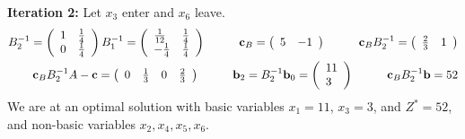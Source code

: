 \textbf{Iteration 2:}  Let $x_3$ enter and $x_6$ leave.
\begin{align*}
B_2^{-1} =\left(
\begin{array}{ll}
 1 & \frac{1}{4} \\
 0 & \frac{1}{4}
\end{array}
\right)B_1^{-1}=  \left(
\begin{array}{ll}
 \frac{1}{12} & \frac{1}{4} \\
 -\frac{1}{4} & \frac{1}{4}
\end{array}
\right)
\cm
\vec{c}_B = \left(
\begin{array}{ll}
  5 & -1
\end{array}
\right)
\cm
\vec{c}_B B_2^{-1} = \left(
\begin{array}{ll}
 \frac{2}{3} & 1
\end{array}
\right)
\\ %
\vec{c}_B B_2^{-1} A - \vec{c} = \left(
\begin{array}{llll}
 0 & \frac{1}{3} & 0 & \frac{2}{3}
\end{array}
\right)
\cm
\vec{b}_2 = B_2^{-1}\vec{b}_0 = \left(
\begin{array}{l}
 11 \\
 3
\end{array}
\right)
\cm
\vec{c}_B B_2^{-1} \vec{b} = 52
\end{align*}
We are at an optimal solution with basic variables $x_1 = 11$, $x_3 = 3$, and $Z^* = 52$, and non-basic variables $x_2, x_4,x_5, x_6$.


